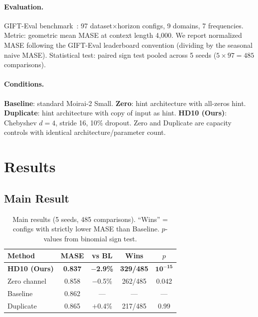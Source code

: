 \documentclass[letterpaper]{article}
\begin{document}
\paragraph{Evaluation.} GIFT-Eval benchmark~\citep{vijay2024gifteval}: 97 dataset$\times$horizon configs, 9 domains, 7 frequencies. Metric: geometric mean MASE at context length 4,000. We report normalized MASE following the GIFT-Eval leaderboard convention (dividing by the seasonal naive MASE). Statistical test: paired sign test pooled across 5 seeds ($5 \times 97 = 485$ comparisons).

\paragraph{Conditions.} \textbf{Baseline}: standard Moirai-2 Small. \textbf{Zero}: hint architecture with all-zeros hint. \textbf{Duplicate}: hint architecture with copy of input as hint. \textbf{HD10 (Ours)}: Chebyshev $d{=}4$, stride 16, 10\% dropout. Zero and Duplicate are capacity controls with identical architecture/parameter count.

\section{Results}

\subsection{Main Result}

\begin{table}[t]
\centering
\caption{Main results (5 seeds, 485 comparisons). ``Wins'' = configs with strictly lower MASE than Baseline. $p$-values from binomial sign test.}
\label{tab:main}
\small
\begin{tabular}{@{}lcccc@{}}
\toprule
\textbf{Method} & \textbf{MASE} & \textbf{vs BL} & \textbf{Wins} & \textbf{$p$} \\
\midrule
\textbf{HD10 (Ours)} & \textbf{0.837} & \textbf{$-$2.9\%} & \textbf{329/485} & $\mathbf{10^{-15}}$ \\
Zero channel & 0.858 & $-$0.5\% & 262/485 & 0.042 \\
Baseline & 0.862 & --- & --- & --- \\
Duplicate & 0.865 & $+$0.4\% & 217/485 & 0.99 \\
\bottomrule
\end{tabular}
\end{table}
\end{document}
